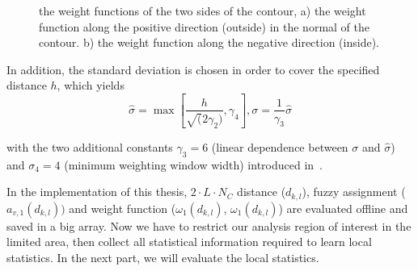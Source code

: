 \begin{figure} 
  \begin{minipage}[t]{0.45\linewidth} 
    \centering 
  \end{minipage}%
  \begin{minipage}[t]{0.45\linewidth} 
    \centering 
  \end{minipage} 
\caption{the weight functions of the two sides of the contour, a) the
  weight function along the positive direction (outside) in the normal of the
  contour. b) the weight function along the negative direction (inside). }
\label{fig:weight}
\end{figure}

In addition, the standard
deviation is chosen in order to cover the specified distance $h$,
which yields 
\begin{equation}
  \label{eq:5.11}
  \hat{\sigma} = \max \left[\frac{h}{\sqrt(2\gamma_2)}, \gamma_4
  \right], \sigma  = \frac{1}{\gamma_3} \hat{\sigma}
\end{equation}

with the two additional constants $\gamma_3 = 6$ (linear dependence
between $\sigma$ and $\hat{\sigma}$) and $\sigma_4 = 4$ (minimum
weighting window width) introduced in~\cite{panin2006efficient}. 

In the implementation of this thesis,
$2 \cdot L \cdot N_C$ distance ($d_{k,l}$), fuzzy assignment
($a_{v,1}(d_{k,l}))$ and weight function ($\omega_1(d_{k,l})$,
$\omega_1(d_{k,l})$) are evaluated offline and saved in a big
array. Now we have to restrict our analysis region of interest in the
limited area, then collect all statistical information required to learn
local statistics. In the next part, we will evaluate the local
statistics.

